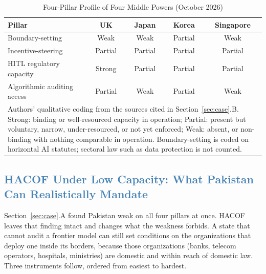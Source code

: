 \documentclass[journal]{IEEEtran}
\newcommand{\hacof}{HACOF}
\begin{document}
\begin{table}[!t]
\caption{Four-Pillar Profile of Four Middle Powers (October 2026)}
\label{tab:middle}
\centering
\footnotesize
\setlength{\tabcolsep}{3pt}
\begin{tabular}{@{}lcccc@{}}
\toprule
\rowcolor{darkblue!15}
\textbf{Pillar} & \textbf{UK} & \textbf{Japan} & \textbf{Korea} & \textbf{Singapore} \\
\midrule
Boundary-setting & Weak & Weak & Partial & Weak \\
\rowcolor{darkblue!5}
Incentive-steering & Partial & Partial & Partial & Partial \\
HITL regulatory capacity & Strong & Partial & Partial & Partial \\
\rowcolor{darkblue!5}
Algorithmic auditing access & Partial & Weak & Partial & Weak \\
\bottomrule
\multicolumn{5}{p{8.3cm}}{\scriptsize Authors' qualitative coding from the sources cited in Section~\ref{sec:case}.B. Strong: binding or well-resourced capacity in operation; Partial: present but voluntary, narrow, under-resourced, or not yet enforced; Weak: absent, or non-binding with nothing comparable in operation. Boundary-setting is coded on horizontal AI statutes; sectoral law such as data protection is not counted.}
\end{tabular}
\end{table}

\subsection{\textcolor{steelblue}{\hacof{} Under Low Capacity: What Pakistan Can Realistically Mandate}}
\label{sec:case-hacof}

Section~\ref{sec:case}.A found Pakistan weak on all four pillars at once. \hacof{} leaves that finding intact and changes what the weakness forbids. A state that cannot audit a frontier model can still set conditions on the organizations that deploy one inside its borders, because those organizations (banks, telecom operators, hospitals, ministries) are domestic and within reach of domestic law. Three instruments follow, ordered from easiest to hardest.
\end{document}
